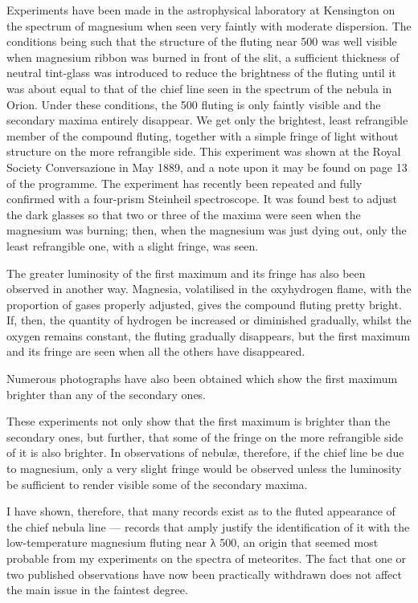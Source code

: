 \documentclass[a4paper, 12pt, oneside, polutonikogreek, english]{article}
\begin{document}
Experiments have been made in the astrophysical laboratory at Kensington on the spectrum of magnesium when seen very faintly with moderate dispersion. The conditions being such that the structure of the fluting near 500 was well visible when magnesium ribbon was burned in front of the slit, a sufficient thickness of neutral tint-glass was introduced to reduce the brightness of the fluting until it was about equal to that of the chief line seen in the spectrum of the nebula in Orion. Under these conditions, the 500 fluting is only faintly visible and the secondary maxima entirely disappear. We get only the brightest, least refrangible member of the compound fluting, together with a simple fringe of light without structure on the more refrangible side. This experiment was shown at the Royal Society Conversazione in May 1889, and a note upon it may be found on page 13 of the programme. The experiment has recently been repeated and fully confirmed with a four-prism Steinheil spectroscope. It was found best to adjust the dark glasses so that two or three of the maxima were seen when the magnesium was burning; then, when the magnesium was just dying out, only the least refrangible one, with a slight fringe, was seen.

The greater luminosity of the first maximum and its fringe has also been observed in another way. Magnesia, volatilised in the oxyhydrogen flame, with the proportion of gases properly adjusted, gives the compound fluting pretty bright. If, then, the quantity of hydrogen be increased or diminished gradually, whilst the oxygen remains constant, the fluting gradually disappears, but the first maximum and its fringe are seen when all the others have disappeared.

Numerous photographs have also been obtained which show the first maximum brighter than any of the secondary ones.

These experiments not only show that the first maximum is brighter than the secondary ones, but further, that some of the fringe on the more refrangible side of it is also brighter. In observations of nebulæ, therefore, if the chief line be due to magnesium, only a very slight fringe would be observed unless the luminosity be sufficient to render visible some of the secondary maxima.

I have shown, therefore, that many records exist as to the fluted appearance of the chief nebula line --- records that amply justify the identification of it with the low-temperature magnesium fluting near λ 500, an origin that seemed most probable from my experiments on the spectra of meteorites. The fact that one or two published observations have now been practically withdrawn does not affect the main issue in the faintest degree.
\end{document}
